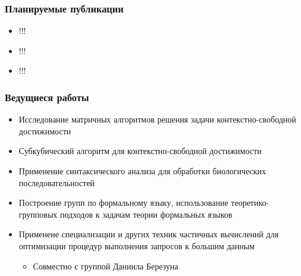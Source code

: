 \documentclass[xcolor=table]{beamer}
\begin{document}
\begin{frame}[fragile]
  \transwipe[direction=90]
  \frametitle{Планируемые публикации}
\begin{itemize}
      \item !!!
      \item !!!
      \item !!!
\end{itemize}
\end{frame}

\begin{frame}[fragile]
  \transwipe[direction=90]
  \frametitle{Ведущиеся работы}
\begin{itemize}
      \item Исследование матричных алгоритмов решения задачи контекстно-свободной достижимости
      \item Субкубический алгоритм для контекстно-свободной достижимости
      \item Применение синтаксического анализа для обработки биологических последовательностей
      \item Построение групп по формальному языку, использование теоретико-групповых подходов к задачам теории формальных языков
      \item Применеие специализации и других техник частичных вычислений для оптимизации процедур выполнения запросов к большим данным
      \begin{itemize}
        \item Совместно с группой Даниила Березуна
      \end{itemize}
\end{itemize}
\end{frame}
\end{document}
